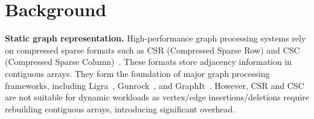 \section{Background}
\label{sec:background}







\textbf{Static graph representation.}
High-performance graph processing systems rely on compressed
sparse formats such as CSR (Compressed Sparse Row) and CSC
(Compressed Sparse Column)~\cite{wheatman2018packed}.
These formats store adjacency information in contiguous arrays.
They form the foundation of major graph processing frameworks,
including Ligra~\cite{Shun2013Ligra},
Gunrock~\cite{Wang2016Gunrock}, and GraphIt~\cite{Zhang2018GraphIt}.
However, CSR and CSC are not suitable for dynamic workloads as vertex/edge insertions/deletions require rebuilding contiguous arrays, introducing significant overhead.

